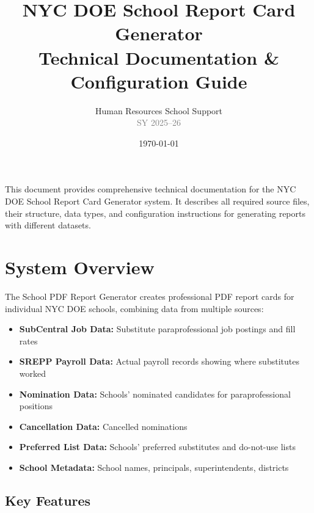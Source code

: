 \documentclass[12pt,letterpaper]{article}
\title{\textbf{\LARGE\textcolor{nycdoeblue}{NYC DOE School Report Card Generator}}\\
\vspace{0.5cm}
\Large Technical Documentation \& Configuration Guide}
\author{Human Resources School Support\\
\textcolor{graytext}{SY 2025--26}}
\date{\today}
\begin{document}
\maketitle
\thispagestyle{empty}

\vspace{1cm}
\begin{tcolorbox}[colback=blue!5!white,colframe=nycdoeblue,title=\textbf{Document Purpose}]
This document provides comprehensive technical documentation for the NYC DOE School Report Card Generator system. It describes all required source files, their structure, data types, and configuration instructions for generating reports with different datasets.
\end{tcolorbox}

\newpage
\tableofcontents
\newpage

\section{System Overview}

The School PDF Report Generator creates professional PDF report cards for individual NYC DOE schools, combining data from multiple sources:

\begin{itemize}[leftmargin=*]
    \item \textbf{SubCentral Job Data:} Substitute paraprofessional job postings and fill rates
    \item \textbf{SREPP Payroll Data:} Actual payroll records showing where substitutes worked
    \item \textbf{Nomination Data:} Schools' nominated candidates for paraprofessional positions
    \item \textbf{Cancellation Data:} Cancelled nominations
    \item \textbf{Preferred List Data:} Schools' preferred substitutes and do-not-use lists
    \item \textbf{School Metadata:} School names, principals, superintendents, districts
\end{itemize}

\subsection{Key Features}
\end{document}
